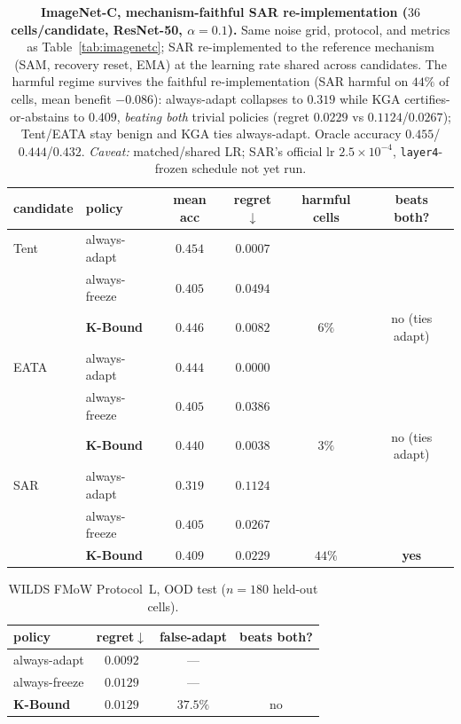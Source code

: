 \documentclass[conference]{IEEEtran}
\theoremstyle{plain}
\theoremstyle{definition}
\begin{document}
\begin{table}[t]\centering\small
\begin{tabular}{llcccc}
\toprule
candidate & policy & mean acc & regret$\downarrow$ & harmful cells & beats both? \\
\midrule
Tent & always-adapt     & $\mathbf{0.454}$ & $0.0007$          &        & \\
     & always-freeze    & $0.405$          & $0.0494$          &        & \\
     & \textbf{K-Bound} & $0.446$          & $0.0082$          & $6\%$  & no (ties adapt) \\
\midrule
EATA & always-adapt     & $\mathbf{0.444}$ & $0.0000$          &        & \\
     & always-freeze    & $0.405$          & $0.0386$          &        & \\
     & \textbf{K-Bound} & $0.440$          & $0.0038$          & $3\%$  & no (ties adapt) \\
\midrule
SAR  & always-adapt     & $0.319$          & $0.1124$          &        & \\
     & always-freeze    & $0.405$          & $0.0267$          &        & \\
     & \textbf{K-Bound} & $\mathbf{0.409}$ & $\mathbf{0.0229}$ & $44\%$ & \textbf{yes} \\
\bottomrule
\end{tabular}
\caption{\textbf{ImageNet-C, mechanism-faithful SAR re-implementation ($36$ cells/candidate,
ResNet-50, $\alpha{=}0.1$).} Same noise grid, protocol, and metrics as Table~\ref{tab:imagenetc};
SAR re-implemented to the reference mechanism (SAM, recovery reset, EMA) at the learning rate shared
across candidates. The harmful regime survives the faithful re-implementation (SAR harmful on $44\%$
of cells, mean benefit $-0.086$): always-adapt collapses to $0.319$ while \textsc{KGA}
certifies-or-abstains to $0.409$, \emph{beating both} trivial policies (regret $0.0229$ vs
$0.1124$/$0.0267$); Tent/EATA stay benign and \textsc{KGA} ties always-adapt. Oracle accuracy
$0.455$/$0.444$/$0.432$. \emph{Caveat:} matched/shared LR; SAR's official lr $2.5{\times}10^{-4}$,
\texttt{layer4}-frozen schedule not yet run.}
\label{tab:imagenetc-faithful}
\end{table}

\begin{table}[H]\centering\small
\caption{WILDS FMoW Protocol~L, OOD test ($n{=}180$ held-out cells).}
\label{tab:fmow-L}
\begin{tabular}{lccc}
\toprule
policy & regret$\downarrow$ & false-adapt & beats both? \\
\midrule
always-adapt  & $0.0092$ & --- & \\
always-freeze & $0.0129$ & --- & \\
\textbf{K-Bound} & $0.0129$ & $37.5\%$ & no \\
\bottomrule
\end{tabular}
\end{table}
\end{document}
